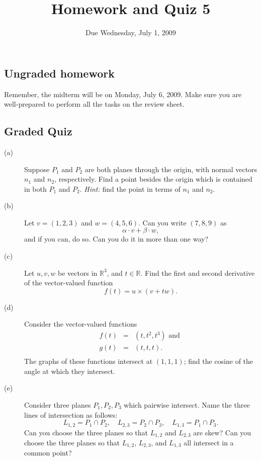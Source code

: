 \documentclass[12pt]{article}
\title{Homework and Quiz 5}
\date{Due Wednesday, July 1, 2009}
\newcommand{\R}{\mathbb{R}}
\begin{document}
\maketitle

\subsection*{Ungraded homework}

Remember, the midterm will be on Monday, July 6, 2009.  Make sure you
are well-prepared to perform all the tasks on the review sheet.

\vfill

\subsection*{Graded Quiz}

\begin{description}
\item[(a)] Suppose $P_1$ and $P_2$ are both planes through the origin,
  with normal vectors $n_1$ and $n_2$, respectively.  Find a point
  besides the origin which is contained in both $P_1$ and $P_2$.
  \textit{Hint:} find the point in terms of $n_1$ and $n_2$.
\vfill
\item[(b)] Let $v = (1,2,3)$ and $w = (4,5,6)$.  Can you write
  $(7,8,9)$ as
$$
\alpha \cdot v + \beta \cdot w,
$$
and if you can, do so.  Can you do it in more than one way?
\vfill
\item[(c)] Let $u,v,w$ be vectors in $\R^3$, and $t \in \R$.  Find the
  first and second derivative of the vector-valued function
$$
f(t) = u \times (v + t w).
$$
\item[(d)] Consider the vector-valued functions
\vfill
\begin{eqnarray*}
f(t) &=& (t,t^2,t^3) \mbox{ and } \\
g(t) &=& (t,t,t). \\
\end{eqnarray*}
The graphs of these functions intersect at $(1,1,1)$; find the cosine
of the angle at which they intersect.
\vfill
\item[(e)] Consider three planes $P_1, P_2, P_3$ which pairwise intersect.  Name the three lines of intersection as follows:
$$
L_{1,2} = P_1 \cap P_2, \hspace{1em}
L_{2,3} = P_2 \cap P_3, \hspace{1em}
L_{1,3} = P_1 \cap P_3.
$$
Can you choose the three planes so that $L_{1,2}$ and $L_{2,3}$ are skew?  Can you choose the three planes so that $L_{1,2}$, $L_{2,3}$, and $L_{1,3}$ all intersect in a common point?

\end{description}
\end{document}

